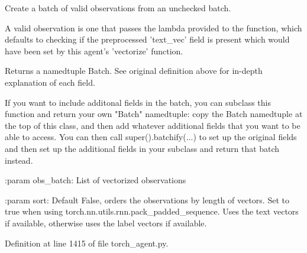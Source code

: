 \begin{DoxyVerb}Create a batch of valid observations from an unchecked batch.

A valid observation is one that passes the lambda provided to the
function, which defaults to checking if the preprocessed 'text_vec'
field is present which would have been set by this agent's 'vectorize'
function.

Returns a namedtuple Batch. See original definition above for in-depth
explanation of each field.

If you want to include additonal fields in the batch, you can subclass
this function and return your own "Batch" namedtuple: copy the Batch
namedtuple at the top of this class, and then add whatever additional
fields that you want to be able to access. You can then call
super().batchify(...) to set up the original fields and then set up the
additional fields in your subclass and return that batch instead.

:param obs_batch:
    List of vectorized observations

:param sort:
    Default False, orders the observations by length of vectors. Set to
    true when using torch.nn.utils.rnn.pack_padded_sequence.  Uses the text
    vectors if available, otherwise uses the label vectors if available.
\end{DoxyVerb}
 

Definition at line 1415 of file torch\+\_\+agent.\+py.



